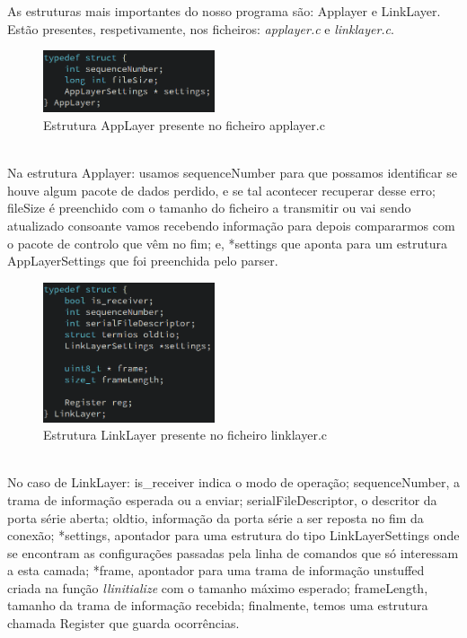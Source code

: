 \documentclass[a4paper]{article}
\begin{document}
As estruturas mais importantes do nosso programa são: Applayer e LinkLayer.
Estão presentes, respetivamente, nos ficheiros: \textit{applayer.c} e
\textit{linklayer.c}.\\
\begin{figure}[h]
\centering
    \includegraphics[width=0.45\textwidth]{applayerStruct.png}
    \caption{Estrutura AppLayer presente no ficheiro applayer.c}
\end{figure} \\
Na estrutura Applayer: usamos sequenceNumber para que
possamos identificar se houve algum pacote de dados perdido, e se tal acontecer
recuperar desse erro; fileSize é preenchido com o tamanho do ficheiro a
transmitir ou vai sendo atualizado consoante vamos recebendo informação para
depois compararmos com o pacote de controlo que vêm no fim; e, *settings que
aponta para um estrutura AppLayerSettings que foi preenchida pelo parser.\\
\begin{figure}[h]
\centering
    \includegraphics[width=0.45\textwidth]{linklayerStruct.png}
    \caption{Estrutura LinkLayer presente no ficheiro linklayer.c}
\end{figure}
\\ No
caso de LinkLayer: is\_receiver indica o modo de operação; sequenceNumber, a
trama de informação esperada ou a enviar; serialFileDescriptor, o descritor da
porta série aberta; oldtio, informação da porta série a ser reposta no fim da
conexão; *settings, apontador para uma estrutura do tipo LinkLayerSettings onde
se encontram as configurações passadas pela linha de comandos que só interessam
a esta camada; *frame, apontador para uma trama de informação unstuffed criada
na função \textit{llinitialize} com o tamanho máximo esperado; frameLength, tamanho da
trama de informação recebida; finalmente, temos uma estrutura chamada Register
que guarda ocorrências.
\end{document}
